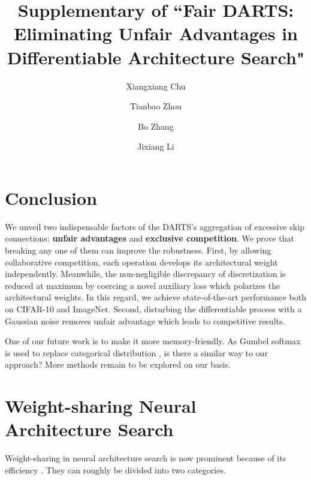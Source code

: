 \documentclass[runningheads]{llncs}
\begin{document}
\section{Conclusion}

We unveil two indispensable factors of the DARTS's aggregation of excessive skip connections: \textbf{unfair advantages} and \textbf{exclusive competition}. We prove that breaking any one of them can improve the robustness. First, by allowing collaborative competition, each operation develops its architectural weight independently. Meanwhile, the non-negligible discrepancy of discretization is reduced at maximum by coercing a novel auxiliary loss which polarizes the architectural weights. In this regard, we achieve state-of-the-art performance both on CIFAR-10 and ImageNet. Second, disturbing the differentiable process with a Gaussian noise removes unfair advantage which leads to competitive results. 
 
One of our future work is to make it more memory-friendly. As Gumbel softmax is used to replace categorical distribution \cite{wu2018fbnet}, is there a similar way to our approach? More methods remain to be explored on our basis.


\clearpage
\title{Supplementary of  ``Fair DARTS: Eliminating Unfair Advantages in Differentiable Architecture Search"}



\author{Xiangxiang Chu  \and
	Tianbao Zhou  \and
	Bo Zhang  \and
	Jixiang Li}

\maketitle
\section{Weight-sharing Neural Architecture Search}

Weight-sharing in neural architecture search is now prominent because of its efficiency \cite{brock2017smash,pham2018efficient,bender2018understanding,guo2019single}. They can roughly be divided into two categories.
\end{document}
